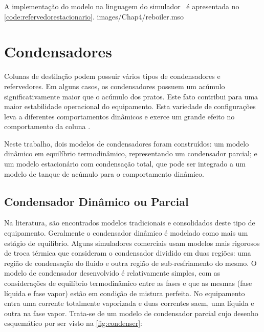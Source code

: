 A implementação do modelo na linguagem do simulador \emso\ é apresentada no
\autoref{code:refervedorestacionario}.
 {images/Chap4/reboiler.mso}

\section{Condensadores}
Colunas de destilação podem possuir vários tipos de condensadores e
refervedores.
Em alguns casos, os condensadores possuem um acúmulo significativamente
maior que o acúmulo dos pratos. Este fato contribui para uma maior estabilidade
operacional do equipamento.
Esta variedade de configurações leva a
diferentes comportamentos dinâmicos e exerce um grande efeito no comportamento da coluna \cite{Kooijman:1995a}.

Neste trabalho, dois modelos de condensadores foram construídos: um modelo
dinâmico em equilíbrio termodinâmico, representando um condensador parcial;
e um modelo estacionário com condensação total, que pode ser integrado a um modelo de tanque
de acúmulo para o comportamento dinâmico.

\subsection{Condensador Dinâmico ou Parcial} \label{sec:modelocondensadordinamico}
Na literatura, são encontrados modelos tradicionais e consolidados deste tipo de equipamento. Geralmente o condensador
dinâmico é
modelado como mais um estágio de equilíbrio. Alguns simuladores comerciais usam modelos mais rigorosos de troca térmica
que consideram o condensador dividido em duas regiões: uma região de condensação do fluido e outra região de
sub-resfriamento do mesmo. O modelo de condensador desenvolvido é relativamente simples, com
as considerações de equilíbrio termodinâmico entre as fases e que as mesmas (fase líquida e fase vapor) estão
em condição de mistura perfeita. No equipamento entra uma corrente totalmente vaporizada e duas correntes saem,
uma líquida e outra na fase vapor. Trata-se de um modelo de condensador parcial cujo desenho esquemático por ser
visto na \autoref{fig:condenser}:

